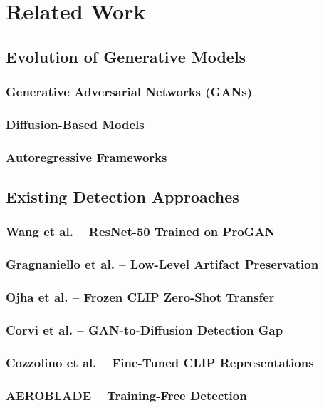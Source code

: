 \chapter{Related Work}\label{chap:related}

\section{Evolution of Generative Models}\label{sec:gen-models}
\subsection{Generative Adversarial Networks (GANs)}
\subsection{Diffusion-Based Models}
\subsection{Autoregressive Frameworks}

\section{Existing Detection Approaches}\label{sec:detection-approaches}
\subsection{Wang et al. -- ResNet-50 Trained on ProGAN}
\subsection{Gragnaniello et al. -- Low-Level Artifact Preservation}
\subsection{Ojha et al. -- Frozen CLIP Zero-Shot Transfer}
\subsection{Corvi et al. -- GAN-to-Diffusion Detection Gap}
\subsection{Cozzolino et al. -- Fine-Tuned CLIP Representations}
\subsection{AEROBLADE -- Training-Free Detection}

